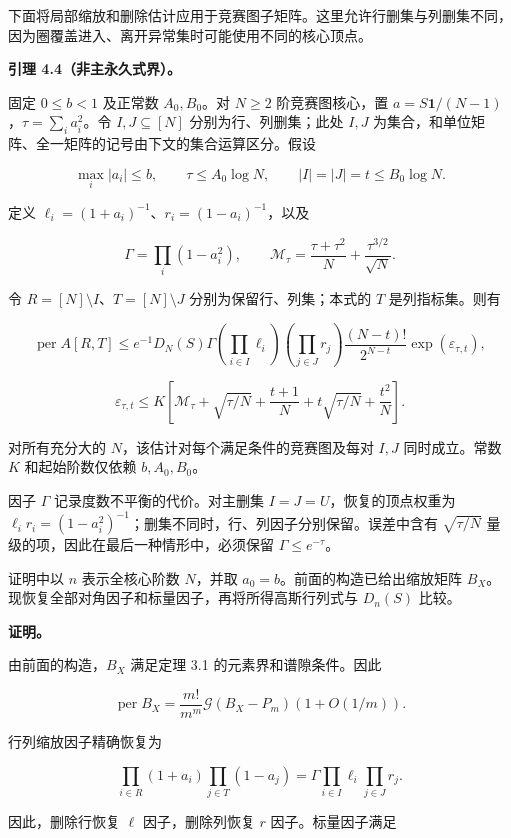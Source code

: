 \documentclass[11pt,a4paper]{article}
\begin{document}
下面将局部缩放和删除估计应用于竞赛图子矩阵。这里允许行删集与列删集不同，因为圈覆盖进入、离开异常集时可能使用不同的核心顶点。

\textbf{引理 4.4（非主永久式界）。}

固定 \(0\le b<1\) 及正常数 \(A_0,B_0\)。对 \(N\ge2\) 阶竞赛图核心，置 \(a=S\mathbf1/(N-1)\)，\(\tau=\sum_i a_i^2\)。令 \(I,J\subseteq[N]\) 分别为行、列删集；此处 \(I,J\) 为集合，和单位矩阵、全一矩阵的记号由下文的集合运算区分。假设

\[\max_i|a_i|\le b,\qquad
\tau\le A_0\log N,\qquad
|I|=|J|=t\le B_0\log N.\]

定义 \(\ell_i=(1+a_i)^{-1}\)、\(r_i=(1-a_i)^{-1}\)，以及

\[\Gamma=\prod_i(1-a_i^2),\qquad
\mathcal M_\tau=\frac{\tau+\tau^2}{N}+\frac{\tau^{3/2}}{\sqrt N}.\]

令 \(R=[N]\setminus I\)、\(T=[N]\setminus J\) 分别为保留行、列集；本式的 \(T\) 是列指标集。则有

\[\operatorname{per}A[R,T]\le
e^{-1}D_N(S)\Gamma
\left(\prod_{i\in I}\ell_i\right)
\left(\prod_{j\in J}r_j\right)
\frac{(N-t)!}{2^{N-t}}\exp(\varepsilon_{\tau,t}),\]

\[\varepsilon_{\tau,t}\le K\left[
\mathcal M_\tau+\sqrt{\tau/N}+\frac{t+1}{N}
+t\sqrt{\tau/N}+\frac{t^2}{N}\right].\]

对所有充分大的 \(N\)，该估计对每个满足条件的竞赛图及每对 \(I,J\) 同时成立。常数 \(K\) 和起始阶数仅依赖 \(b,A_0,B_0\)。

因子 \(\Gamma\) 记录度数不平衡的代价。对主删集 \(I=J=U\)，恢复的顶点权重为 \(\ell_i r_i=(1-a_i^2)^{-1}\)；删集不同时，行、列因子分别保留。误差中含有 \(\sqrt{\tau/N}\) 量级的项，因此在最后一种情形中，必须保留 \(\Gamma\le e^{-\tau}\)。

证明中以 \(n\) 表示全核心阶数 \(N\)，并取 \(a_0=b\)。前面的构造已给出缩放矩阵 \(B_X\)。现恢复全部对角因子和标量因子，再将所得高斯行列式与 \(D_n(S)\) 比较。

\textbf{证明。}

由前面的构造，\(B_X\) 满足定理 3.1 的元素界和谱隙条件。因此

\[\operatorname{per}B_X=\frac{m!}{m^m}\mathcal G(B_X-P_m)(1+O(1/m)).\]

行列缩放因子精确恢复为

\[\prod_{i\in R}(1+a_i)\prod_{j\in T}(1-a_j)=\Gamma\prod_{i\in I}\ell_i\prod_{j\in J}r_j.\]

因此，删除行恢复 \(\ell\) 因子，删除列恢复 \(r\) 因子。标量因子满足
\end{document}
